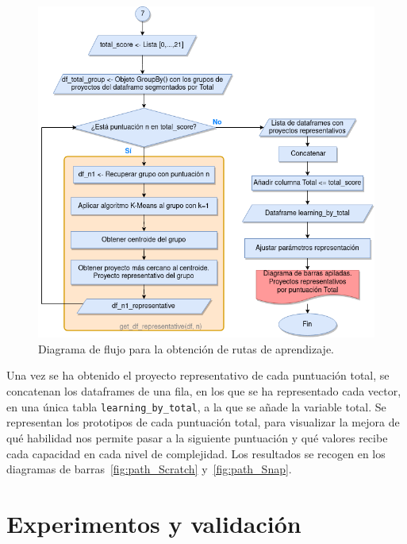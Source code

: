 \documentclass[a4paper, 12pt]{book}
\begin{document}
\begin{figure}
    \centering
    \includegraphics[height=.6\textheight]{img/ruta_de_aprendizajeCaja.png}
    \caption{Diagrama de flujo para la obtención de rutas de aprendizaje.}\label{fig:diagrama_rutas}
\end{figure}

Una vez se ha obtenido el proyecto representativo de cada puntuación total, se concatenan los dataframes de una fila, en los que se ha representado cada vector, en una única tabla \texttt{learning\_by\_total}, a la que se añade la variable total. Se representan los prototipos de cada puntuación total, para visualizar la mejora de qué habilidad nos permite pasar a la siguiente puntuación y qué valores recibe cada capacidad en cada nivel de complejidad. Los resultados se recogen en los diagramas de barras~\ref{fig:path_Scratch} y~\ref{fig:path_Snap}.


\cleardoublepage
\chapter{Experimentos y validación}
\label{chap:experimentos}
\end{document}
